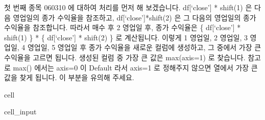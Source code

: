 \documentclass[letterpaper,10pt,english]{jupyterBook}
\begin{document}
\sphinxAtStartPar
첫 번째 종목 060310 에 대하여 처리를 먼저 해 보겠습니다. df{[}‘close’{]} * shift(\sphinxhyphen{}1) 은 다음 영업일의 종가 수익율을 참조하고, df{[}‘close’{]}*shift(\sphinxhyphen{}2) 은 그 다음의 영업일의 종가 수익율을 참조합니다. 따라서 매수 후 2 영업일 후, 종가 수익율은 \{ df{[}‘close’{]} * shift(\sphinxhyphen{}1) \} * \{ df{[}‘close’{]} * shift(\sphinxhyphen{}2) \} 로 계산됩니다. 이렇게 1 영업일, 2 영업일, 3 영업일, 4 영업일, 5 영업일 후 종가 수익율을 새로운 컬럼에 생성하고, 그 중에서 가장 큰 수익율을 고르면 됩니다. 생성된 컬럼 중 가장 큰 값은 max(axis=1) 로 찾습니다. 참고로 max() 에서는 axis=0 이 Default 라서 axis=1 로 정해주지 않으면 열에서 가장 큰 값을 찾게 됩니다. 이 부분을 유의해 주세요.

\begin{sphinxuseclass}{cell}\begin{sphinxVerbatimInput}

\begin{sphinxuseclass}{cell_input}
\begin{sphinxVerbatim}[commandchars=\\\{\}]
  
  \PYG{p}{[}\PYG{p}{[}\PYG{p}{]}\PYG{p}{]}


\end{sphinxVerbatim}
\end{sphinxuseclass}
\end{sphinxVerbatimInput}
\end{sphinxuseclass}
\end{document}
